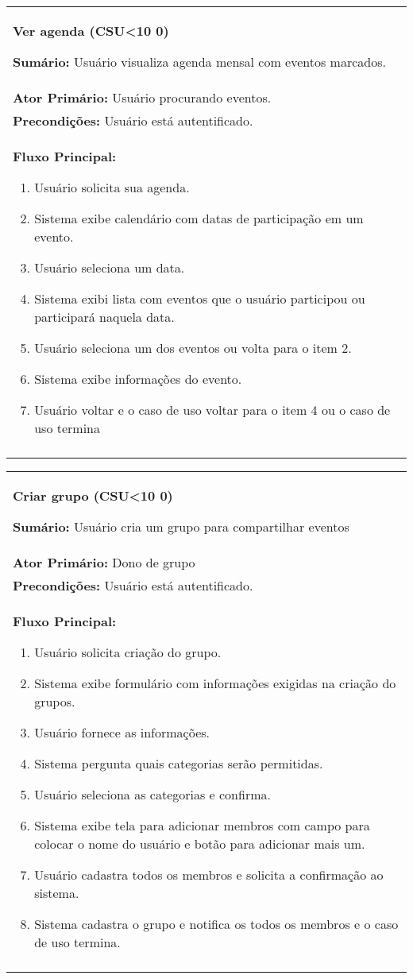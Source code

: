 \documentclass{article}
\newcounter{cscounter}
\newcommand{\sumario}[1] {\textbf{Sumário:} #1\\ }
\newcommand{\ator}[1] {\textbf{Ator Primário:} #1\\}
\newcommand{\precond}[1] {\textbf{Precondições:} #1\\}
\newcommand{\fluxo}{\textbf{Fluxo Principal:}}
\newenvironment{casosdeuso}[1]
{
 \stepcounter{cscounter}
 \begin{center}
 \begin{tabular}{|p{\textwidth}|}
 \hline
 \begin{center}
 \large \textbf{#1 (CSU\ifnum\value{cscounter}<10 0\fi\arabic{cscounter})}
 \end{center}
}
{ 
 \\\\\hline
 \end{tabular} 
 \end{center}
}
\begin{document}
\begin{casosdeuso}{Ver agenda}
 \sumario{Usuário visualiza agenda mensal com eventos marcados.}
 \ator{Usuário procurando eventos.}
 \precond{Usuário está autentificado.}
 \fluxo
\begin{enumerate}[itemsep=0mm]
 \item Usuário solicita sua agenda.
 \item Sistema exibe calendário com datas de participação em um evento.
 \item Usuário seleciona um data.
 \item Sistema exibi lista com eventos que o usuário participou ou participará naquela data.
 \item Usuário seleciona um dos eventos ou volta para o item 2.
 \item Sistema exibe informações do evento.
 \item Usuário voltar e o caso de uso voltar para o item 4 ou o caso de uso termina
\end{enumerate}
\end{casosdeuso}



\begin{casosdeuso}{Criar grupo}
 \sumario{Usuário cria um grupo para compartilhar eventos}
 \ator{Dono de grupo}
 \precond{Usuário está autentificado.}
\fluxo
\begin{enumerate}[itemsep=0mm]
 \item Usuário solicita criação do grupo.
 \item Sistema exibe formulário com informações exigidas na criação do grupos.
 \item Usuário fornece as informações.
 \item Sistema pergunta quais categorias serão permitidas.
 \item Usuário seleciona as categorias e confirma.
 \item Sistema exibe tela para adicionar membros com campo para colocar o nome do usuário e botão para adicionar mais um.
 \item Usuário cadastra todos os membros e solicita a confirmação ao sistema.
 \item Sistema cadastra o grupo e notifica os todos os membros e o caso de uso termina.
\end{enumerate}
\end{casosdeuso}
\end{document}
